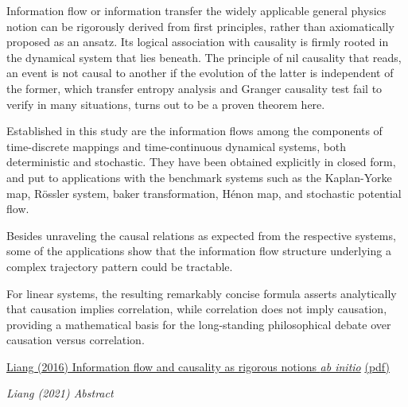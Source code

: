 \documentclass[
]{book}
\begin{document}
Information flow or information transfer the widely applicable
general physics notion can be rigorously derived
from first principles, rather than axiomatically proposed as an ansatz.
Its logical association with causality is firmly rooted in the dynamical
system that lies beneath.
The principle of nil causality that reads, an event is not causal to another
if the evolution of the latter is independent of the former,
which transfer entropy analysis and Granger causality test fail to verify
in many situations, turns out to be a proven theorem here.

Established in this study are the information flows among the components of
time-discrete mappings and time-continuous dynamical systems,
both deterministic and stochastic.
They have been obtained explicitly in closed form, and put to applications
with the benchmark systems such as the Kaplan-Yorke map, Rössler system,
baker transformation, Hénon map, and stochastic potential flow.

Besides unraveling the causal relations as expected from the respective systems,
some of the applications show that the information flow structure underlying a
complex trajectory pattern could be tractable.

For linear systems, the resulting remarkably concise formula asserts analytically that
causation implies correlation,
while correlation does not imply causation,
providing a mathematical basis for the long-standing philosophical debate
over causation versus correlation.

\href{https://journals.aps.org/pre/abstract/10.1103/PhysRevE.94.052201}{Liang (2016) Information flow and causality as rigorous notions \emph{ab initio}}
\href{pdf/Liang_2016_Information_Flow_Causality.pdf}{(pdf)}

\emph{Liang (2021) Abstract}
\end{document}
